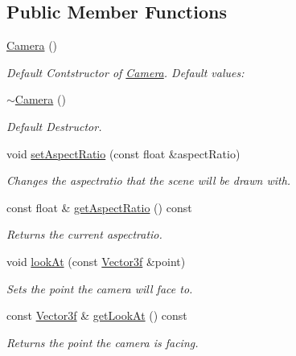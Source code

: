 \subsection*{Public Member Functions}
\begin{DoxyCompactItemize}
\item 
\hyperlink{classburn_1_1_camera_aa0eac6e197cfbebe709b524eae890a02}{Camera} ()
\begin{DoxyCompactList}\small\item\em Default Contstructor of \hyperlink{classburn_1_1_camera}{Camera}. Default values\-: \end{DoxyCompactList}\item 
\hyperlink{classburn_1_1_camera_a717df173cafcdce81c01eb6744332ae7}{$\sim$\-Camera} ()
\begin{DoxyCompactList}\small\item\em Default Destructor. \end{DoxyCompactList}\item 
void \hyperlink{classburn_1_1_camera_ac3ebe6eb9c44fe8068e397c8e22b5c72}{set\-Aspect\-Ratio} (const float \&aspect\-Ratio)
\begin{DoxyCompactList}\small\item\em Changes the aspectratio that the scene will be drawn with. \end{DoxyCompactList}\item 
const float \& \hyperlink{classburn_1_1_camera_a0867612bbd199c663e477ffe68e989f6}{get\-Aspect\-Ratio} () const 
\begin{DoxyCompactList}\small\item\em Returns the current aspectratio. \end{DoxyCompactList}\item 
void \hyperlink{classburn_1_1_camera_aacfbde225b770a51a020ec15403b1c41}{look\-At} (const \hyperlink{namespaceburn_afdd7cfb352b9612432faf6947b6fff74}{Vector3f} \&point)
\begin{DoxyCompactList}\small\item\em Sets the point the camera will face to. \end{DoxyCompactList}\item 
const \hyperlink{namespaceburn_afdd7cfb352b9612432faf6947b6fff74}{Vector3f} \& \hyperlink{classburn_1_1_camera_a6e2e4ace192d77e5a9d9b62d2c2915da}{get\-Look\-At} () const 
\begin{DoxyCompactList}\small\item\em Returns the point the camera is facing. \end{DoxyCompactList}\item 

\end{DoxyCompactItemize}

